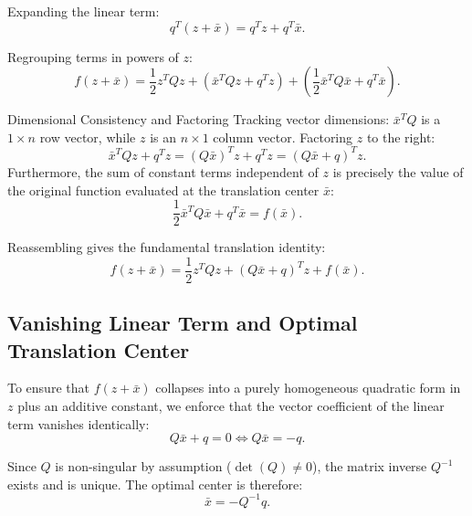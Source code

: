 Expanding the linear term:
\begin{equation}
    q^T (z + \bar{x}) = q^T z + q^T \bar{x}.
\end{equation}

Regrouping terms in powers of $z$:
\begin{equation}
    f(z + \bar{x}) = \frac{1}{2} z^T Q z + \left( \bar{x}^T Q z + q^T z \right) + \left( \frac{1}{2} \bar{x}^T Q \bar{x} + q^T \bar{x} \right).
\end{equation}

\begin{noteblock}{Dimensional Consistency and Factoring}
Tracking vector dimensions: $\bar{x}^T Q$ is a $1 \times n$ row vector, while $z$ is an $n \times 1$ column vector. Factoring $z$ to the right:
\begin{equation}
    \bar{x}^T Q z + q^T z = (Q \bar{x})^T z + q^T z = (Q \bar{x} + q)^T z.
\end{equation}
Furthermore, the sum of constant terms independent of $z$ is precisely the value of the original function evaluated at the translation center $\bar{x}$:
\begin{equation}
    \frac{1}{2} \bar{x}^T Q \bar{x} + q^T \bar{x} = f(\bar{x}).
\end{equation}
\end{noteblock}

Reassembling gives the fundamental translation identity:
\begin{equation}
    f(z + \bar{x}) = \frac{1}{2} z^T Q z + (Q \bar{x} + q)^T z + f(\bar{x}).
    \label{eq:fundamental-translation-identity}
\end{equation}

\subsection{Vanishing Linear Term and Optimal Translation Center}
To ensure that $f(z + \bar{x})$ collapses into a purely homogeneous quadratic form in $z$ plus an additive constant, we enforce that the vector coefficient of the linear term vanishes identically:
\begin{equation}
    Q \bar{x} + q = 0 \iff Q \bar{x} = -q.
\end{equation}

Since $Q$ is non-singular by assumption ($\det(Q) \neq 0$), the matrix inverse $Q^{-1}$ exists and is unique. The optimal center is therefore:
\begin{equation}
    \bar{x} = -Q^{-1} q.
    \label{eq:translation-center-opt}
\end{equation}

